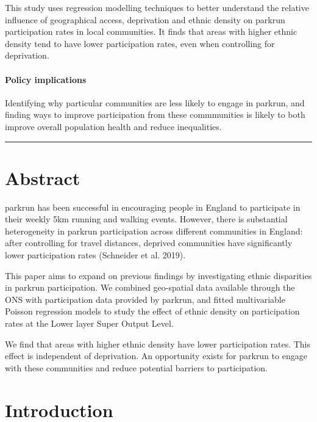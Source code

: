 \documentclass[]{article}
\let\oldparagraph\paragraph
\renewcommand{\paragraph}[1]{\oldparagraph{#1}\mbox{}}
\begin{document}
This study uses regression modelling techniques to better understand the
relative influence of geographical access, deprivation and ethnic
density on parkrun participation rates in local communities. It finds
that areas with higher ethnic density tend to have lower participation
rates, even when controlling for deprivation.

\hypertarget{policy-implications}{%
\paragraph{Policy implications}\label{policy-implications}}

Identifying why particular communities are less likely to engage in
parkrun, and finding ways to improve participation from these
commmunities is likely to both improve overall population health and
reduce inequalities.

\begin{center}\rule{0.5\linewidth}{\linethickness}\end{center}

\hypertarget{abstract}{%
\section{Abstract}\label{abstract}}

parkrun has been successful in encouraging people in England to
participate in their weekly 5km running and walking events. However,
there is substantial heterogeneity in parkrun participation across
different communities in England: after controlling for travel
distances, deprived communities have significantly lower participation
rates (Schneider et al. 2019).

This paper aims to expand on previous findings by investigating ethnic
disparities in parkrun participation. We combined geo-spatial data
available through the ONS with participation data provided by parkrun,
and fitted multivariable Poisson regression models to study the effect
of ethnic density on participation rates at the Lower layer Super Output
Level.

We find that areas with higher ethnic density have lower participation
rates. This effect is independent of deprivation. An opportunity exists
for parkrun to engage with these communities and reduce potential
barriers to participation.

\hypertarget{introduction}{%
\section{Introduction}\label{introduction}}
\end{document}
